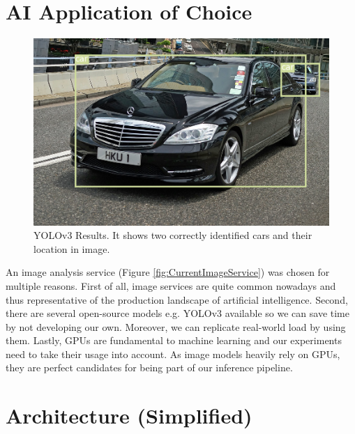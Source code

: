 \documentclass{report}
\begin{document}
\section{AI Application of Choice}

\begin{figure}[h!]
  \includegraphics[width=\textwidth]{hku1.jpeg}
  \caption{YOLOv3 Results. It shows two correctly identified cars and their location in image.}
  \label{fig:YOLOResults}
\end{figure}

An image analysis service (Figure \ref{fig:CurrentImageService}) was chosen for multiple reasons.
First of all, image services are quite common nowadays and thus representative of the production landscape of artificial intelligence.
Second, there are several open-source models e.g. YOLOv3 \cite{YOLOv3} available so we can save time by not developing our own.
Moreover, we can replicate real-world load by using them.
Lastly, GPUs are fundamental to machine learning and our experiments need to take their usage into account.
As image models heavily rely on GPUs, they are perfect candidates for being part of our inference pipeline.

\section{Architecture (Simplified)}
\end{document}
